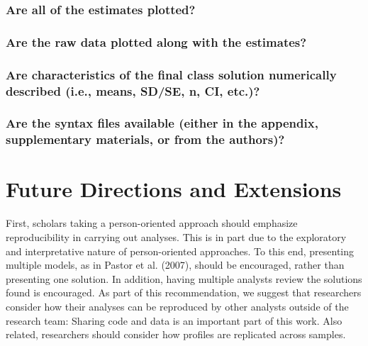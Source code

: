 \documentclass[man]{apa6}
\begin{document}
\hypertarget{are-all-of-the-estimates-plotted}{%
\subsubsection{Are all of the estimates plotted?}\label{are-all-of-the-estimates-plotted}}

\hypertarget{are-the-raw-data-plotted-along-with-the-estimates}{%
\subsubsection{Are the raw data plotted along with the estimates?}\label{are-the-raw-data-plotted-along-with-the-estimates}}

\hypertarget{are-characteristics-of-the-final-class-solution-numerically-described-i.e.-means-sdse-n-ci-etc.}{%
\subsubsection{Are characteristics of the final class solution numerically described (i.e., means, SD/SE, n, CI, etc.)?}\label{are-characteristics-of-the-final-class-solution-numerically-described-i.e.-means-sdse-n-ci-etc.}}

\hypertarget{are-the-syntax-files-available-either-in-the-appendix-supplementary-materials-or-from-the-authors}{%
\subsubsection{Are the syntax files available (either in the appendix, supplementary materials, or from the authors)?}\label{are-the-syntax-files-available-either-in-the-appendix-supplementary-materials-or-from-the-authors}}

\hypertarget{future-directions-and-extensions}{%
\section{Future Directions and Extensions}\label{future-directions-and-extensions}}

First, scholars taking a
person-oriented approach should emphasize reproducibility in carrying out
analyses. This is in part due to the exploratory and interpretative nature of
person-oriented approaches. To this end, presenting multiple models, as in
Pastor et al. (2007), should be encouraged, rather than presenting one solution.
In addition, having multiple analysts review the solutions found is encouraged.
As part of this recommendation, we suggest that researchers consider how their
analyses can be reproduced by other analysts outside of the research team:
Sharing code and data is an important part of this work. Also related,
researchers should consider how profiles are replicated across samples.
\end{document}
